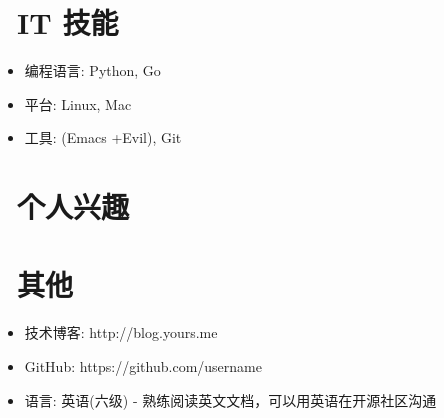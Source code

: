 \documentclass{resume}
\begin{document}

\section{\faCogs\ IT 技能}
\begin{itemize}[parsep=0.5ex]
  \item 编程语言: Python, Go
  \item 平台: Linux, Mac
  \item 工具: (Emacs +Evil), Git
\end{itemize}

\section{\faHeartO\ 个人兴趣}

\section{\faInfo\ 其他}
\begin{itemize}[parsep=0.5ex]
  \item 技术博客: http://blog.yours.me
  \item GitHub: https://github.com/username
  \item 语言: 英语(六级) - 熟练阅读英文文档，可以用英语在开源社区沟通
\end{itemize}

%
%
\end{document}
